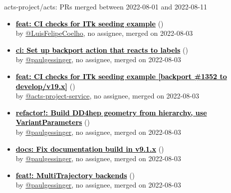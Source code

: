 \begin{frame}[allowframebreaks]{ acts-project/acts: PRs merged 
between 2022-08-01 and 2022-08-11
}
\begin{itemize}
    \item\prmerged\textbf{\href{https://github.com/acts-project/acts/pull/1352}{\textcolor{black}{feat: CI checks for ITk seeding example}}}
    (\href{https://github.com/acts-project/acts/pull/1352}{}) \\
    by \href{https://github.com/LuisFelipeCoelho}{@LuisFelipeCoelho}, {}no assignee, merged on 2022-08-03

    \item\prmerged\textbf{\href{https://github.com/acts-project/acts/pull/1365}{\textcolor{black}{ci: Set up backport action that reacts to labels}}}
    (\href{https://github.com/acts-project/acts/pull/1365}{}) \\
    by \href{https://github.com/paulgessinger}{@paulgessinger}, {}no assignee, merged on 2022-08-03

    \item\prmerged\textbf{\href{https://github.com/acts-project/acts/pull/1366}{\textcolor{black}{feat: CI checks for ITk seeding example [backport \#1352 to develop/v19.x]}}}
    (\href{https://github.com/acts-project/acts/pull/1366}{}) \\
    by \href{https://github.com/acts-project-service}{@acts-project-service}, {}no assignee, merged on 2022-08-03

    \item\prmerged\textbf{\href{https://github.com/acts-project/acts/pull/1257}{\textcolor{black}{refactor!: Build DD4hep geometry from hierarchy, use VariantParameters}}}
    (\href{https://github.com/acts-project/acts/pull/1257}{}) \\
    by \href{https://github.com/paulgessinger}{@paulgessinger}, {}no assignee, merged on 2022-08-03

    \item\prmerged\textbf{\href{https://github.com/acts-project/acts/pull/1369}{\textcolor{black}{docs: Fix documentation build in v9.1.x}}}
    (\href{https://github.com/acts-project/acts/pull/1369}{}) \\
    by \href{https://github.com/paulgessinger}{@paulgessinger}, {}no assignee, merged on 2022-08-03

    \item\prmerged\textbf{\href{https://github.com/acts-project/acts/pull/1262}{\textcolor{black}{feat!: MultiTrajectory backends}}}
    (\href{https://github.com/acts-project/acts/pull/1262}{}) \\
    by \href{https://github.com/paulgessinger}{@paulgessinger}, {}no assignee, merged on 2022-08-03


\end{itemize}
\end{frame}
